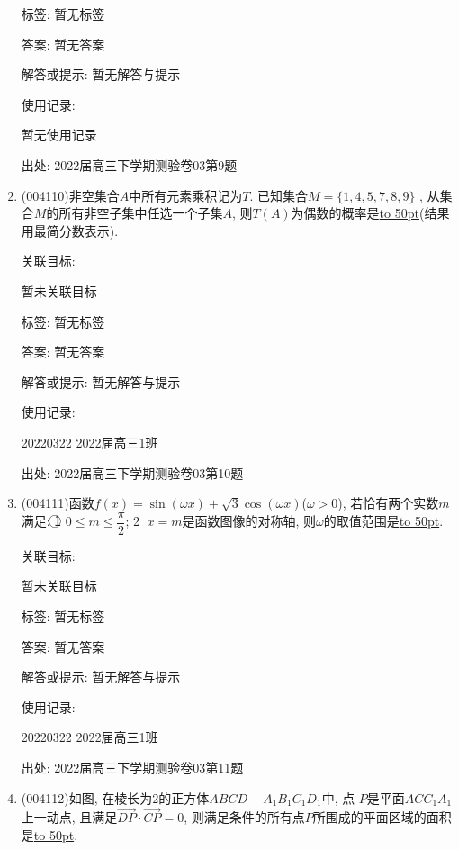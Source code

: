 \documentclass[10pt,a4paper]{article}
\newcommand{\blank}[1]{\underline{\hbox to #1pt{}}}
\begin{document}
\begin{enumerate}[1.]
标签: 暂无标签

答案: 暂无答案

解答或提示: 暂无解答与提示

使用记录:

暂无使用记录


出处: 2022届高三下学期测验卷03第9题
\item { (004110)}非空集合$A$中所有元素乘积记为$T$. 已知集合$M=\{1,4,5,7,8,9\}$ , 从集合$M$的所有非空子集中任选一个子集$A$, 则$T(A)$为偶数的概率是\blank{50}(结果用最简分数表示).


关联目标:

暂未关联目标



标签: 暂无标签

答案: 暂无答案

解答或提示: 暂无解答与提示

使用记录:

20220322	2022届高三1班	


出处: 2022届高三下学期测验卷03第10题
\item { (004111)}函数$f(x)=\sin(\omega x)+\sqrt 3\cos (\omega x)$($\omega >0$), 若恰有两个实数$m$满足: \textcircled{1}  $0\le m\le \dfrac{\pi}2$; \textcircled{2} $x=m$是函数图像的对称轴, 则$\omega$的取值范围是\blank{50}.


关联目标:

暂未关联目标



标签: 暂无标签

答案: 暂无答案

解答或提示: 暂无解答与提示

使用记录:

20220322	2022届高三1班	


出处: 2022届高三下学期测验卷03第11题
\item { (004112)}如图, 在棱长为$2$的正方体$ABCD-A_1B_1C_1D_1$中, 点
$P$是平面$ACC_1A_1$上一动点, 且满足$\overrightarrow{DP}\cdot \overrightarrow{CP}=0$, 则满足条件的所有点$P$所围成的平面区域的面积是\blank{50}.
\begin{center}
\end{center}



\end{enumerate}
\end{document}
